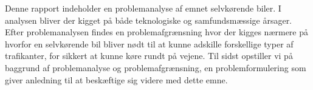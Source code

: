 Denne rapport indeholder en problemanalyse af emnet selvkørende biler. I analysen bliver der kigget på både teknologiske og samfundsmæssige årsager. Efter problemanalysen findes en problemafgrænsning hvor der kigges nærmere på hvorfor en selvkørende bil bliver nødt til at kunne adskille forskellige typer af trafikanter, for sikkert at kunne køre rundt på vejene. Til sidst opstiller vi på baggrund af problemanalyse og problemafgrænsning, en problemformulering som giver anledning til at beskæftige sig videre med dette emne.
